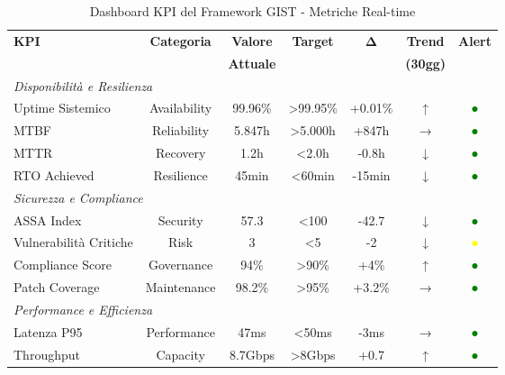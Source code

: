 


\begin{table}[htbp]
\centering
\caption{Dashboard KPI del Framework GIST - Metriche Real-time}
\label{tab:gist_dashboard}
\begin{tabular}{lcccccc}
\toprule
\textbf{KPI} & \textbf{Categoria} & \textbf{Valore} & \textbf{Target} & \textbf{Δ} & \textbf{Trend} & \textbf{Alert} \\
 & & \textbf{Attuale} & & & \textbf{(30gg)} & \\
\midrule
\multicolumn{7}{l}{\textit{Disponibilità e Resilienza}} \\
\midrule
Uptime Sistemico & Availability & 99.96\% & >99.95\% & +0.01\% & ↑ & \textcolor{green}{●} \\
MTBF & Reliability & 5.847h & >5.000h & +847h & → & \textcolor{green}{●} \\
MTTR & Recovery & 1.2h & <2.0h & -0.8h & ↓ & \textcolor{green}{●} \\
RTO Achieved & Resilience & 45min & <60min & -15min & ↓ & \textcolor{green}{●} \\
\midrule
\multicolumn{7}{l}{\textit{Sicurezza e Compliance}} \\
\midrule
ASSA Index & Security & 57.3 & <100 & -42.7 & ↓ & \textcolor{green}{●} \\
Vulnerabilità Critiche & Risk & 3 & <5 & -2 & ↓ & \textcolor{yellow}{●} \\
Compliance Score & Governance & 94\% & >90\% & +4\% & ↑ & \textcolor{green}{●} \\
Patch Coverage & Maintenance & 98.2\% & >95\% & +3.2\% & → & \textcolor{green}{●} \\
\midrule
\multicolumn{7}{l}{\textit{Performance e Efficienza}} \\
\midrule
Latenza P95 & Performance & 47ms & <50ms & -3ms & → & \textcolor{green}{●} \\
Throughput & Capacity & 8.7Gbps & >8Gbps & +0.7 & ↑ & \textcolor{green}{●} \\

\end{tabular}
\end{table}
